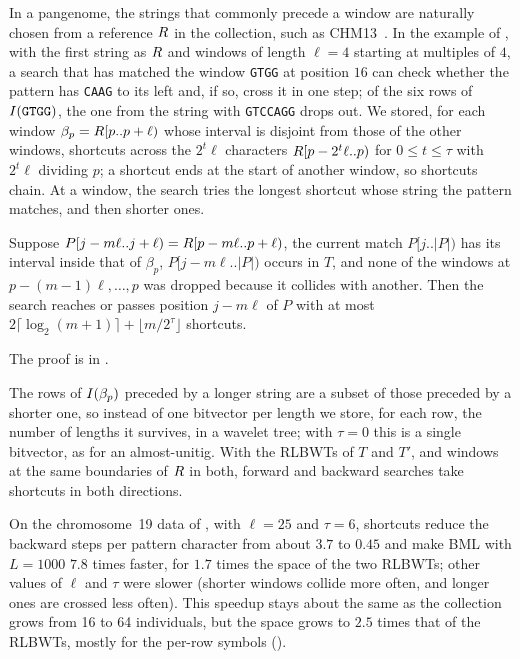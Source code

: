 In a pangenome, the strings that commonly precede a window are
naturally chosen from a reference $R$ in the collection, such as
CHM13~\cite{NurkEtAl2022}. In the example of , with the
first string as $R$ and windows of length $\ell = 4$ starting at
multiples of $4$, a search that has matched the window
\texttt{GTGG} at position $16$ can check whether the pattern has
\texttt{CAAG} to its left and, if so, cross it in one step; of the six
rows of $I(\texttt{GTGG})$, the one from the string with
\texttt{GTCCAGG} drops out. We stored, for each window $\beta_p = R[p..p
+ \ell)$ whose interval is disjoint from those of the other windows,
shortcuts across the $2^t \ell$ characters $R[p - 2^t \ell .. p)$
for $0 \le t \le \tau$ with $2^t \ell$ dividing $p$; a shortcut ends at
the start of another window, so shortcuts chain. At a window, the
search tries the longest shortcut whose string the pattern matches, and
then shorter ones.

\begin{lemma}
\label{lem:count}
Suppose $P[j - m\ell .. j + \ell) = R[p - m\ell .. p + \ell)$,
the current match $P[j..|P|)$ has its interval inside that of
$\beta_p$, $P[j - m\ell .. |P|)$ occurs in $T$, and none of the windows
at $p - (m-1)\ell, \ldots, p$ was dropped because it collides with
another. Then the search reaches or passes position $j - m\ell$ of $P$
with at most $2\lceil \log_2(m+1) \rceil + \lfloor m / 2^\tau \rfloor$
shortcuts.
\end{lemma}

The proof is in .

The rows of
$I(\beta_p)$ preceded by a longer string are a subset of those
preceded by a shorter one, so instead of one bitvector per length we
store, for each row, the number of lengths it survives, in a wavelet
tree; with $\tau = 0$ this is a single bitvector, as for an
almost-unitig. With the RLBWTs of $T$ and $T'$, and windows at the same
boundaries of $R$ in both, forward and backward searches take
shortcuts in both directions.

On the chromosome~19 data of , with $\ell = 25$
and $\tau = 6$, shortcuts reduce the backward steps per pattern
character from about $3.7$ to $0.45$ and make BML with $L = 1000$
$7.8$ times faster, for $1.7$ times the space of the two
RLBWTs; other values of $\ell$ and $\tau$ were slower (shorter windows
collide more often, and longer ones are crossed less often). This
speedup stays about the same as the collection grows from 16 to 64
individuals, but the space grows to $2.5$ times that of the
RLBWTs, mostly for the per-row symbols ().

